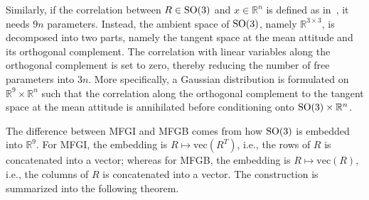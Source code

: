 Similarly, if the correlation between $R\in\mathrm{SO}(3)$ and $x\in\mathbb{R}^n$ is defined as in~\cite{mardia1978model}, it needs $9n$ parameters. 
Instead, the ambient space of $\mathrm{SO}(3)$, namely $\mathbb{R}^{3\times 3}$, is decomposed into two parts, namely the tangent space at the mean attitude and its orthogonal complement.
The correlation with linear variables along the orthogonal complement is set to zero, thereby reducing the number of free parameters into $3n$.
More specifically, a Gaussian distribution is formulated on $\mathbb{R}^9\times\mathbb{R}^n$ such that the correlation along the orthogonal complement to the tangent space at the mean attitude is annihilated before conditioning onto $\mathrm{SO}(3)\times\mathbb{R}^n$.

The difference between MFGI and MFGB comes from how $\mathrm{SO}(3)$ is embedded into $\mathbb{R}^9$.
For MFGI, the embedding is $R\mapsto \mathrm{vec}(R^T)$, i.e., the rows of $R$ is concatenated into a vector;
whereas for MFGB, the embedding is $R\mapsto \mathrm{vec}(R)$, i.e., the columns of $R$ is concatenated into a vector.
The construction is summarized into the following theorem.
